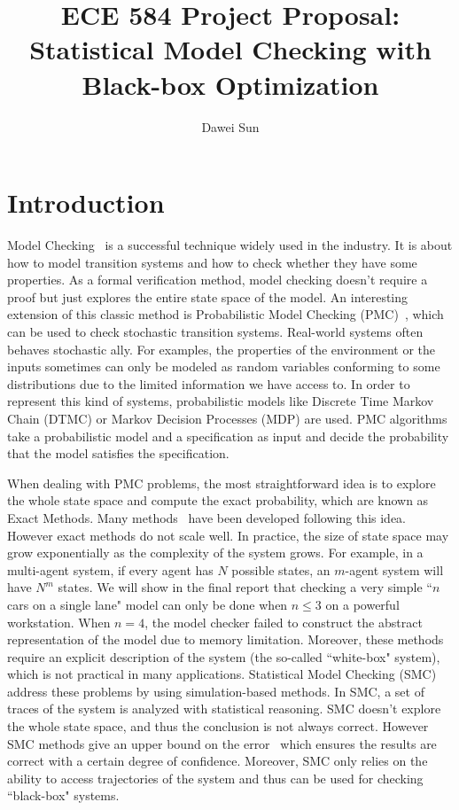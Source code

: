\documentclass[11pt]{article}
\begin{document}
\author{Dawei Sun}
\title{ECE 584 Project Proposal: Statistical Model Checking with Black-box Optimization}
\maketitle

\section{Introduction}
Model Checking~\cite{clarke2018model} is a successful technique widely used in the industry. It is about how to model transition systems and how to check whether they have some properties. As a formal verification method, model checking doesn't require a proof but just explores the entire state space of the model. An interesting extension of this classic method is Probabilistic Model Checking (PMC)~\cite{ciesinski2004probabilistic}, which can be used to check stochastic transition systems. Real-world systems often behaves stochastic ally. For examples, the properties of the environment or the inputs sometimes can only be modeled as random variables conforming to some distributions due to the limited information we have access to. In order to represent this kind of systems, probabilistic models like Discrete Time Markov Chain (DTMC) or Markov Decision Processes (MDP) are used. PMC algorithms take a probabilistic model and a specification as input and decide the probability that the model satisfies the specification.

When dealing with PMC problems, the most straightforward idea is to explore the whole state space and compute the exact probability, which are known as Exact Methods. Many methods~\cite{ciesinski2004probabilistic,kwiatkowska2011prism,baier1997symbolic} have been developed following this idea. However exact methods do not scale well. In practice, the size of state space may grow exponentially as the complexity of the system grows. For example, in a multi-agent system, if every agent has $N$ possible states, an $m$-agent system will have $N^m$ states. We will show in the final report that checking a very simple ``$n$ cars on a single lane" model can only be done when $n \leq 3$ on a powerful workstation. When $n=4$, the model checker failed to construct the abstract representation of the model due to memory limitation. Moreover, these methods require an explicit description of the system (the so-called ``white-box" system), which is not practical in many applications. Statistical Model Checking (SMC)~\cite{agha2018survey} address these problems by using simulation-based methods. In SMC, a set of traces of the system is analyzed with statistical reasoning. SMC doesn't explore the whole state space, and thus the conclusion is not always correct. However SMC methods give an upper bound on the error~\cite{herault2004approximate} which ensures the results are correct with a certain degree of confidence. Moreover, SMC only relies on the ability to access trajectories of the system and thus can be used for checking ``black-box" systems.
\end{document}
